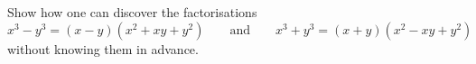 Show how one can discover the factorisations
\[
x^3-y^3=(x-y)(x^2+xy+y^2)\qquad\text{and}\qquad x^3+y^3=(x+y)(x^2-xy+y^2)
\]
without knowing them in advance.

